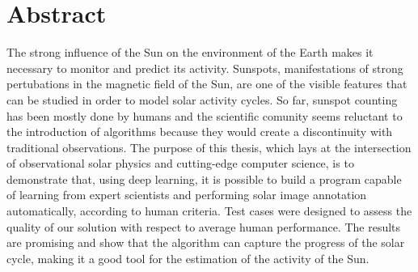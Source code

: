 \newpage
\chapter*{Abstract}


\noindent The strong influence of the Sun on the environment of the Earth makes it necessary to monitor and predict its activity. Sunspots, manifestations of strong pertubations in the magnetic field of the Sun, are one of the visible features that can be studied in order to model solar activity cycles. So far, sunspot counting has been mostly done by humans and the scientific comunity seems reluctant to the introduction of algorithms because they would create a discontinuity with traditional observations. The purpose of this thesis, which lays at the intersection of observational solar physics and cutting-edge computer science, is to demonstrate that, using deep learning, it is possible to build a program capable of learning from expert scientists and performing solar image annotation automatically, according to human criteria. Test cases were designed to assess the quality of our solution with respect to average human performance. The results are promising and show that the algorithm can capture the progress of the solar cycle, making it a good tool for the estimation of the activity of the Sun.
